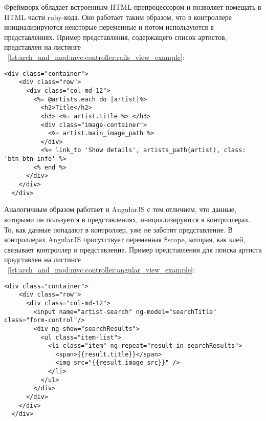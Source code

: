 
Фреймворк \ror{} обладает встроенным HTML-препроцессором и позволяет помещать в HTML части ruby-кода. Оно работает таким образом, что в контроллере инициализируются некоторые переменные и потом используются в представлениях. Пример представления, содержащего список артистов, представлен на листинге ~\ref{lst:arch_and_mod:mvc:controller:rails_view_example}:

\begin{lstlisting}[language=HTML5,caption={Пример получения артистов по определённым параметрам}, label=lst:arch_and_mod:mvc:controller:rails_view_example]
  <div class="container">
    <div class="row">
      <div class="col-md-12">
        <%= @artists.each do |artist|%>
          <h2>Title</h2>
          <h3> <%= artist.title %> </h3>
          <div class="image-container">
            <%= artist.main_image_path %>
          </div>
          <%= link_to 'Show details', artists_path(artist), class: 'btn btn-info' %>
        <% end %>
      </div>
    </div>
  </div>
\end{lstlisting}

Аналогичным образом работает и AngularJS с тем отличием, что данные, которыми он пользуется в представлениях, инициализируются в контроллерах. То, как данные попадают в контроллер, уже не заботит представление. В контроллерах AngularJS присутствует переменная \$scope, которая, как клей, связывает контроллер и представление. Пример представления для поиска артиста представлен на листинге ~\ref{lst:arch_and_mod:mvc:controller:angular_view_example}:

\begin{lstlisting}[language=HTML5,caption={Пример получения артистов по определённым параметрам}, label=lst:arch_and_mod:mvc:controller:angular_view_example]
  <div class="container">
    <div class="row">
      <div class="col-md-12">
        <input name="artist-search" ng-model="searchTitle" class="form-control"/>
        <div ng-show="searchResults">
          <ul class="item-list">
            <li class="item" ng-repeat="result in searchResults">
              <span>{{result.title}}</span>
              <img src="{{result.image_src}}" />
            </li>
          </ul>
        </div>
      </div>
    </div>
  </div>
\end{lstlisting}


